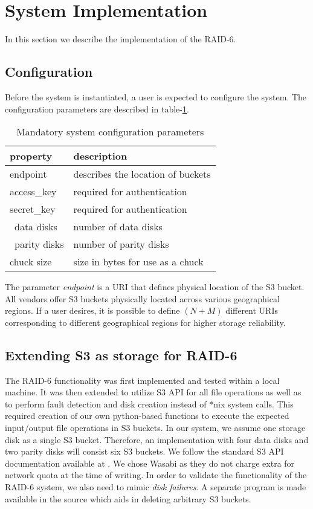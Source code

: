 \section{System Implementation}
\label{sec:implementation}
In this section we describe the implementation of the RAID-6.

\subsection{Configuration}
Before the system is instantiated, a user is expected to configure the system.
The configuration parameters are described in table-\ref{table:config}.

\begin{table}[H]
\begin{tabular}{|l|l|}
\hline
\textbf{property} & \textbf{description}              \\ \hline
endpoint          & describes the location of buckets \\ \hline
access\_key       & required for authentication       \\ \hline
secret\_key       & required for authentication       \\ \hline
\ data disks      & number of data disks              \\ \hline
\ parity disks    & number of parity disks            \\ \hline
chuck size        & size in bytes for use as a chuck  \\ \hline
\end{tabular}
\caption{Mandatory system configuration parameters}
\label{table:config}
\end{table}

The parameter \textit{endpoint} is a URI that defines physical location of the S3 bucket.
All vendors offer S3 buckets physically located across various geographical regions.
If a user desires, it is possible to define $(N + M)$ different URIs corresponding to different geographical regions for higher storage reliability.

\subsection{Extending S3 as storage for RAID-6}

The RAID-6 functionality was first implemented and tested within a local machine.
It was then extended to utilize S3 API for all file operations as well as to perform fault detection and disk creation instead of *nix system calls.
This required creation of our own python-based functions to execute the expected input/output file operations in S3 buckets.
In our system, we assume one storage disk as a single S3 bucket.
Therefore, an implementation with four data disks and two parity disks will consist six S3 buckets.
We follow the standard S3 API documentation available at \cite{wasabiDocs}.
We chose Wasabi \cite{wasabiS3} as they do not charge extra for network quota at the time of writing.
In order to validate the functionality of the RAID-6 system, we also need to mimic \textit{disk failures}.
A separate program is made available in the source which aids in deleting arbitrary S3 buckets.

